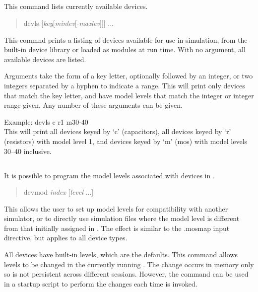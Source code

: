\subsection{}


This command lists currently available devices.
\begin{quote}\vt
devls [{\it key\/}[{\it minlev\/}[-{\it maxlev\/}]]] ...
\end{quote}

This commnd prints a listing of devices available for use in
simulation, from the built-in device library or loaded as modules at
run time.  With no argument, all available devices are listed.

Arguments take the form of a key letter, optionally followed by an
integer, or two integers separated by a hyphen to indicate a range. 
This will print only devices that match the key letter, and have model
levels that match the integer or integer range given.  Any number of
these arguments can be given.

Example:  {\vt devls c r1 m30-40}\\

This will print all devices keyed by `{\vt c}' (capacitors), all
devices keyed by `{\vt r}' (resistors) with model level 1, and devices
keyed by `{\vt m}' (mos) with model levels 30--40 inclusive.

\subsection{}


It is possible to program the model levels associated with devices
in {\WRspice}.
\begin{quote}\vt
devmod {\it index} [{\it level} ...]
\end{quote}

This allows the user to set up model levels for compatibility with
another simulator, or to directly use simulation files where the model
level is different from that initially assigned in {\WRspice}.  The
effect is similar to the {\vt .mosmap} input directive, but applies to
all device types.

All devices have built-in levels, which are the defaults.  This
command allows levels to be changed in the currently running
{\WRspice}.  The change occurs in memory only so is not persistent
across different {\WRspice} sessions.  However, the command can be
used in a startup script to perform the changes each time {\WRspice}
is invoked.

